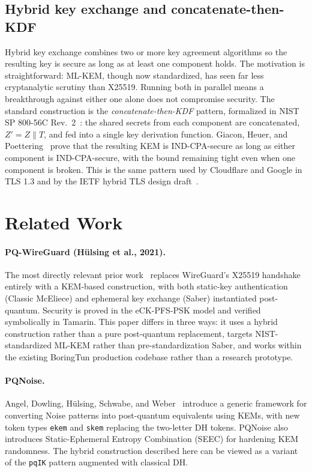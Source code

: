 \documentclass[11pt,a4paper]{article}
\begin{document}
\subsection{Hybrid key exchange and concatenate-then-KDF}

Hybrid key exchange combines two or more key agreement algorithms so the resulting key is secure as long as at least one component holds. The motivation is straightforward: ML-KEM, though now standardized, has seen far less cryptanalytic scrutiny than X25519. Running both in parallel means a breakthrough against either one alone does not compromise security. The standard construction is the \emph{concatenate-then-KDF} pattern, formalized in NIST SP 800-56C Rev.~2~\cite{nist-sp800-56c}: the shared secrets from each component are concatenated, $Z' = Z \| T$, and fed into a single key derivation function. Giacon, Heuer, and Poettering~\cite{giacon2018combiners} prove that the resulting KEM is IND-CPA-secure as long as either component is IND-CPA-secure, with the bound remaining tight even when one component is broken. This is the same pattern used by Cloudflare and Google in TLS 1.3 and by the IETF hybrid TLS design draft~\cite{ietf-tls-hybrid-design}.

\section{Related Work}
\label{sec:related}

\paragraph{PQ-WireGuard (H\"ulsing et al., 2021).}
The most directly relevant prior work~\cite{hulsing2021pqwireguard} replaces WireGuard's X25519 handshake entirely with a KEM-based construction, with both static-key authentication (Classic McEliece) and ephemeral key exchange (Saber) instantiated post-quantum. Security is proved in the eCK-PFS-PSK model and verified symbolically in Tamarin. This paper differs in three ways: it uses a hybrid construction rather than a pure post-quantum replacement, targets NIST-standardized ML-KEM rather than pre-standardization Saber, and works within the existing BoringTun production codebase rather than a research prototype.

\paragraph{PQNoise.}
Angel, Dowling, H\"ulsing, Schwabe, and Weber~\cite{pqnoise2022} introduce a generic framework for converting Noise patterns into post-quantum equivalents using KEMs, with new token types \texttt{ekem} and \texttt{skem} replacing the two-letter DH tokens. PQNoise also introduces Static-Ephemeral Entropy Combination (SEEC) for hardening KEM randomness. The hybrid construction described here can be viewed as a variant of the \texttt{pqIK} pattern augmented with classical DH.
\end{document}
